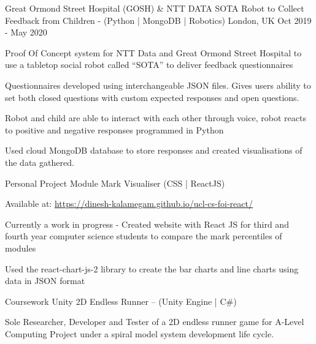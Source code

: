
\begin{cventries}
  \cventry
    {Great Ormond Street Hospital (GOSH) \& NTT DATA} %
    {SOTA Robot to Collect Feedback from Children - (Python | MongoDB | Robotics)} %
    {London, UK} %
    {Oct 2019 - May 2020} %
    {
      \begin{cvitems} %
        \item {Proof Of Concept system for NTT Data and Great Ormond Street Hospital to use a tabletop social robot called ``SOTA'' to deliver feedback questionnaires}
        \item Questionnaires developed using interchangeable JSON files. Gives users ability to set both closed questions with custom expected responses and open questions. 
        \item{Robot and child are able to interact with each other through voice, robot reacts to positive and negative responses programmed in Python}
        \item{Used cloud MongoDB database to store responses and created visualisations of the data gathered.}
      \end{cvitems}
    }

  \cventry
  {Personal Project}
  {Module Mark Visualiser (CSS | ReactJS)}
  {}
  {}
  {
    \begin{cvitems}
      \item Available at: \href{https://dinesh-kalamegam.github.io/ucl-cs-foi-react/}{https://dinesh-kalamegam.github.io/ucl-cs-foi-react/}
      \item Currently a work in progress - Created website with React JS for third and fourth year computer science students to compare the mark percentiles of modules
      \item Used the react-chart-js-2 library to create the bar charts and line charts using data in JSON format
    \end{cvitems}
  }

  \cventry
    {Coursework}
    {Unity 2D Endless Runner – (Unity Engine | C\#)}
    {}
    {}
    {
      \begin{cvitems}
        \item Sole Researcher, Developer and Tester of a 2D endless runner game for A-Level Computing Project under a spiral model system development life cycle.
      \end{cvitems}
    }

\end{cventries}
